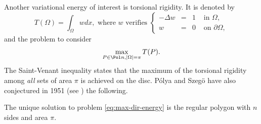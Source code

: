 \begin{rem}
\label{bobu40}
Another variational energy of interest is torsional rigidity. It is denoted by
\begin{equation}
T(\Omega) = \int_\Omega wdx, \text{ where } w \text{ verifies } \left\{\begin{array}{rcll}
-\Delta w & = & 1 & \text{ in }\Omega, \\
w & = & 0 &\text{ on } \partial \Omega,
\end{array}\right.
\label{eq:dirichlet-energy}
\end{equation}
and the problem to consider
\begin{equation}
\max_{P \in \Pol n, |\Omega| = \pi} T(P).
\label{eq:max-dir-energy}
\end{equation}
The Saint-Venant inequality states that the maximum of the torsional rigidity among {\it all} sets of area $\pi$ is achieved on the disc.
Pólya and Szegö have also conjectured in 1951 (see \cite[p.\,158]{PoSz51}) the following.

\begin{conj*}
The unique solution to problem \eqref{eq:max-dir-energy} is the regular polygon with $n$ sides and area $\pi$.
\end{conj*}


\end{rem}
